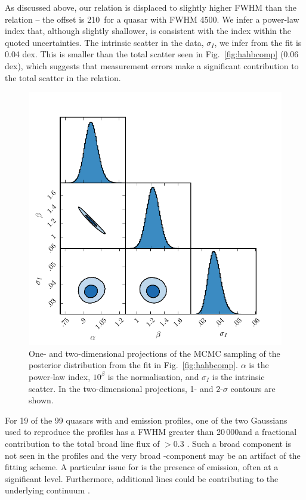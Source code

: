 As discussed above, our relation is displaced to slightly higher \hb FWHM than the \citet{greene05} relation -- the offset is 210\kms\, for a quasar with \ha FWHM 4500\kms.  
We infer a power-law index that, although slightly shallower, is consistent with the \citet{greene05} index within the quoted uncertainties. 
The intrinsic scatter in the data, $\sigma_I$, we infer from  the fit is 0.04 dex. 
This is smaller than the total scatter seen in Fig.~\ref{fig:hahbcomp} (0.06 dex), which suggests that measurement errors make a significant contribution to the total scatter in the relation. 

\begin{figure}
    \includegraphics[width=\columnwidth]{figures/chapter03/ha_hb_mcmc_parameters.pdf} 
    \caption{One- and two-dimensional projections of the MCMC sampling of the posterior distribution from the fit in Fig.~\ref{fig:hahbcomp}. $\alpha$ is the power-law index, $10^\beta$ is the normalisation, and $\sigma_I$ is the intrinsic scatter. In the two-dimensional projections, 1- and 2-$\sigma$ contours are shown.} 
    \label{fig:ha_hb_mcmc_samples}
\end{figure}

For 19 of the 99 quasars with \hb and \ha emission profiles, one of the two Gaussians used to reproduce the \hb profiles has a FWHM greater than 20\,000\kms and a fractional contribution to the total \hb broad line flux of $>$0.3 \citep{marziani09,marziani13}.  
Such a broad component is not seen in the \ha profiles and the very broad \hbns-component may be an artifact of the fitting scheme.
A particular issue for \hb is the presence of  emission, often at a significant level.
Furthermore, additional lines could be contributing to the underlying continuum \citep[e.g. the ,5017 doublet;][]{veron02,zamfir10}. 

